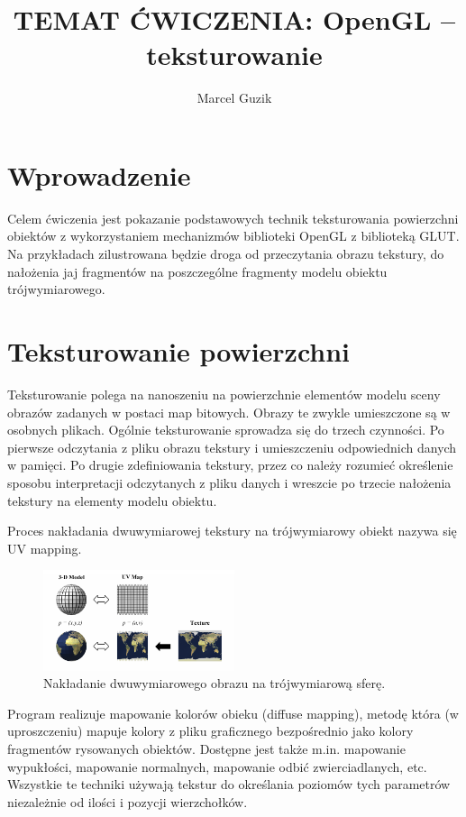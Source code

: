 \documentclass[a4paper]{article}
\title{TEMAT ĆWICZENIA: OpenGL – teksturowanie}
\author{Marcel Guzik}
\begin{document}
\section{Wprowadzenie}

Celem ćwiczenia jest pokazanie podstawowych technik teksturowania powierzchni
obiektów z wykorzystaniem mechanizmów biblioteki OpenGL z biblioteką GLUT. Na
przykładach zilustrowana będzie droga od przeczytania obrazu tekstury, do
nałożenia jaj fragmentów na poszczególne fragmenty modelu obiektu
trójwymiarowego.

\section{Teksturowanie powierzchni}

Teksturowanie polega na nanoszeniu na powierzchnie elementów modelu sceny
obrazów zadanych w postaci map bitowych. Obrazy te zwykle umieszczone są w
osobnych plikach. Ogólnie teksturowanie sprowadza się do trzech czynności. Po
pierwsze odczytania z pliku obrazu tekstury i umieszczeniu odpowiednich
danych w pamięci. Po drugie zdefiniowania tekstury, przez co należy rozumieć
określenie sposobu interpretacji odczytanych z pliku danych i wreszcie po
trzecie nałożenia tekstury na elementy modelu obiektu.

Proces nakładania dwuwymiarowej tekstury na trójwymiarowy obiekt nazywa się UV
mapping.

\begin{figure}[H]
    \centering
    \includegraphics[width=0.5\textwidth]{uvmap}
    \caption{Nakładanie dwuwymiarowego obrazu na trójwymiarową sferę.}
\end{figure}

Program realizuje mapowanie kolorów obieku (diffuse mapping), metodę która (w
uproszczeniu) mapuje kolory z pliku graficznego bezpośrednio jako kolory
fragmentów rysowanych obiektów. Dostępne jest także m.in. mapowanie wypukłości,
mapowanie normalnych, mapowanie odbić zwierciadlanych, etc. Wszystkie te
techniki używają tekstur do określania poziomów tych parametrów niezależnie od
ilości i pozycji wierzchołków.
\end{document}

